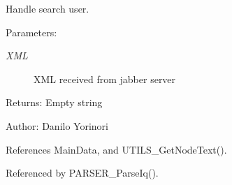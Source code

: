 Handle search user. 

\begin{Desc}
\item[Parameters:]
\begin{description}
\item[{\em XML}]XML received from jabber server \end{description}
\end{Desc}
\begin{Desc}
\item[Returns:]Empty string \end{Desc}
\begin{Desc}
\item[Author:]Danilo Yorinori \end{Desc}


References MainData, and UTILS\_\-GetNodeText().

Referenced by PARSER\_\-ParseIq().
